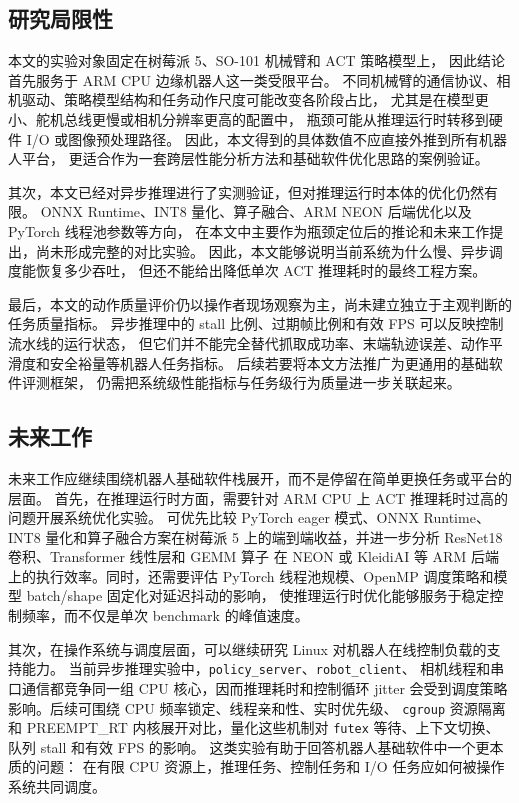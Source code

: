 \subsection{研究局限性}

本文的实验对象固定在树莓派 5、SO-101 机械臂和 ACT 策略模型上，
因此结论首先服务于 ARM CPU 边缘机器人这一类受限平台。
不同机械臂的通信协议、相机驱动、策略模型结构和任务动作尺度可能改变各阶段占比，
尤其是在模型更小、舵机总线更慢或相机分辨率更高的配置中，
瓶颈可能从推理运行时转移到硬件 I/O 或图像预处理路径。
因此，本文得到的具体数值不应直接外推到所有机器人平台，
更适合作为一套跨层性能分析方法和基础软件优化思路的案例验证。

其次，本文已经对异步推理进行了实测验证，但对推理运行时本体的优化仍然有限。
ONNX Runtime、INT8 量化、算子融合、ARM NEON 后端优化以及 PyTorch 线程池参数等方向，
在本文中主要作为瓶颈定位后的推论和未来工作提出，尚未形成完整的对比实验。
因此，本文能够说明当前系统为什么慢、异步调度能恢复多少吞吐，
但还不能给出降低单次 ACT 推理耗时的最终工程方案。

最后，本文的动作质量评价仍以操作者现场观察为主，尚未建立独立于主观判断的任务质量指标。
异步推理中的 stall 比例、过期帧比例和有效 FPS 可以反映控制流水线的运行状态，
但它们并不能完全替代抓取成功率、末端轨迹误差、动作平滑度和安全裕量等机器人任务指标。
后续若要将本文方法推广为更通用的基础软件评测框架，
仍需把系统级性能指标与任务级行为质量进一步关联起来。

\subsection{未来工作}

未来工作应继续围绕机器人基础软件栈展开，而不是停留在简单更换任务或平台的层面。
首先，在推理运行时方面，需要针对 ARM CPU 上 ACT 推理耗时过高的问题开展系统优化实验。
可优先比较 PyTorch eager 模式、ONNX Runtime、INT8 量化和算子融合方案在树莓派 5
上的端到端收益，并进一步分析 ResNet18 卷积、Transformer 线性层和 GEMM 算子
在 NEON 或 KleidiAI 等 ARM 后端上的执行效率。同时，还需要评估 PyTorch
线程池规模、OpenMP 调度策略和模型 batch/shape 固定化对延迟抖动的影响，
使推理运行时优化能够服务于稳定控制频率，而不仅是单次 benchmark 的峰值速度。

其次，在操作系统与调度层面，可以继续研究 Linux 对机器人在线控制负载的支持能力。
当前异步推理实验中，\texttt{policy\_server}、\texttt{robot\_client}、
相机线程和串口通信都竞争同一组 CPU 核心，因而推理耗时和控制循环 jitter
会受到调度策略影响。后续可围绕 CPU 频率锁定、线程亲和性、实时优先级、
\texttt{cgroup} 资源隔离和 PREEMPT\_RT 内核展开对比，量化这些机制对
\texttt{futex} 等待、上下文切换、队列 stall 和有效 FPS 的影响。
这类实验有助于回答机器人基础软件中一个更本质的问题：
在有限 CPU 资源上，推理任务、控制任务和 I/O 任务应如何被操作系统共同调度。

